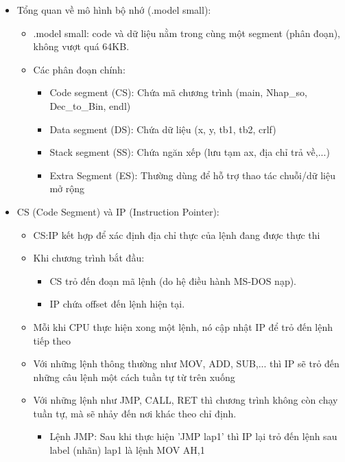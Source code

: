 \begin{itemize}
    
    \item Tổng quan về mô hình bộ nhớ (.model small):
    \begin{itemize}
        \item .model small: code và dữ liệu nằm trong cùng một segment (phân đoạn), không vượt quá 64KB.
        \item Các phân đoạn chính: 
        \begin{itemize}
            \item Code segment (CS): Chứa mã chương trình (main, Nhap\_so, Dec\_to\_Bin, endl)
            \item Data segment (DS): Chứa dữ liệu (x, y, tb1, tb2, crlf)
            \item Stack segment (SS): Chứa ngăn xếp (lưu tạm ax, địa chỉ trả về,...)
            \item Extra Segment	(ES): Thường dùng để hỗ trợ thao tác chuỗi/dữ liệu mở rộng
        \end{itemize}
    \end{itemize}
    \item CS (Code Segment) và IP (Instruction Pointer): 
    \begin{itemize}
        \item CS:IP kết hợp để xác định địa chỉ thực của lệnh đang được thực thi
        \item Khi chương trình bắt đầu: 
        \begin{itemize}
            \item CS trỏ đến đoạn mã lệnh (do hệ điều hành MS-DOS nạp).
            \item IP chứa offset đến lệnh hiện tại.
        \end{itemize}
        \item Mỗi khi CPU thực hiện xong một lệnh, nó cập nhật IP để trỏ đến lệnh tiếp theo
        \item Với những lệnh thông thường như MOV, ADD, SUB,... thì IP sẽ trỏ đến những câu lệnh một cách tuần tự từ trên xuống
        \item Với những lệnh như JMP, CALL, RET thì chương trình không còn chạy tuần tự, mà sẽ nhảy đến nơi khác theo chỉ định.
        \begin{itemize}
            \item Lệnh JMP: Sau khi thực hiện 'JMP lap1' thì IP lại trỏ đến lệnh sau label (nhãn) lap1 là lệnh MOV AH,1

\end{itemize}
\end{itemize}
\end{itemize}
